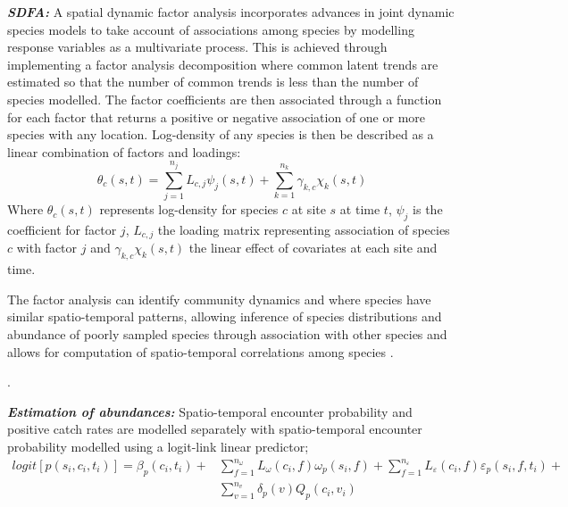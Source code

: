 \documentclass{nature}
\begin{document}
\begin{linenumbers}
\textbf{\textit{SDFA:}} A spatial dynamic factor analysis incorporates advances
in joint dynamic species models\cite{Thorson2017} to take account of
associations among species by modelling response variables as a
multivariate process. This is achieved through implementing a factor analysis
decomposition where common latent trends are estimated so that the number of
common trends is less than the number of species modelled. The factor
coefficients are then associated through a function for each factor that
returns a positive or negative association of one or more species with any
location. Log-density of any species is then be described as a linear
combination of factors and loadings:
	\begin{equation}
		\theta_{c}(s,t) = \sum_{j=1}^{n_{j}}
		L_{c,j}\psi_{j}(s,t) +\sum_{k=1}^{n_{k}}
		\gamma_{k,c}\chi_{k}(s,t)
	\end{equation}
Where $\theta_{c}(s,t)$ represents log-density for species $c$ at site $s$ at
time $t$, $\psi_{j}$ is the coefficient for factor $j$, $L_{c,j}$ the loading
matrix representing association of species $c$ with factor $j$ and
$\gamma_{k,c}\chi_{k}(s,t)$ the linear effect of covariates at each site and
time\cite{Thorson2016b}. 

The factor analysis can identify community dynamics and where species have
similar spatio-temporal patterns, allowing inference of species distributions
and abundance of poorly sampled species through association with other species
and allows for computation of spatio-temporal correlations among species
\cite{Thorson2016b}.

. 

\textbf{\textit{Estimation of abundances:}} Spatio-temporal encounter
probability and positive catch rates are modelled separately with
spatio-temporal encounter probability modelled using a logit-link linear
predictor;
		\begin{equation}
			\begin{split}
			logit[p(s_{i},c_{i},t_{i})] =	\beta_{p}(c_{i},t_{i}) +
			& \sum\limits_{f=1}^{n_{\omega}} L_{\omega}(c_{i},f)
			\omega_{p}(s_{i},f) + \sum\limits_{f=1}^{n_{\varepsilon}}
			L_{\varepsilon}(c_{i},f) \varepsilon_{p}(s_{i},f,t_{i}) + \\ 
			& \sum\limits_{v=1}^{n_{v}}\delta_{p}(v)Q_{p}(c_{i}, v_{i})
		\end{split}
		\end{equation}


\end{linenumbers}
\end{document}
